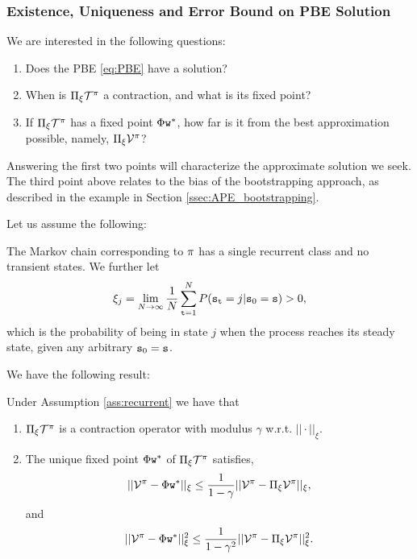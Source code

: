 
\subsubsection{Existence, Uniqueness and Error Bound on PBE Solution}
We are interested in the following questions:
\begin{enumerate}
\item Does the PBE \eqref{eq:PBE} have a solution?
\item When is $\Pi_\xi \mathcal{T}^\pi$ a contraction, and what is its fixed point?
\item If $\Pi_\xi \mathcal{T}^\pi$ has a fixed point $\Phi{\tt w}^*$, how far is it from the best approximation possible, namely, $\Pi_\xi  \mathcal{V}^\pi$?
\end{enumerate}
Answering the first two points will characterize the approximate solution we seek. The third point above relates to the bias of the bootstrapping approach, as described in the example in Section \ref{ssec:APE_bootstrapping}. 

Let us assume the following:
\begin{assumption}\label{ass:recurrent}The Markov chain corresponding to $\pi$ has a single recurrent class and no transient states. We further let
$$\xi_j = \lim_{N\rightarrow \infty} \frac{1}{N} \sum_{{\tt t}=1}^N P({\tt s}_{\tt t}=j|{\tt s}_0={\tt s})>0,$$
which is the probability of being in state $j$ when the process reaches its steady state, given any arbitrary ${\tt s}_0={\tt s}$.
\end{assumption}
We have the following result:
\begin{proposition}\label{prop:PBE_contraction} Under Assumption \ref{ass:recurrent} we have that
\begin{enumerate}
\item $\Pi_\xi \mathcal{T}^\pi$ is a contraction operator with modulus $\gamma$ w.r.t. $||\cdot||_\xi$.
\item The unique fixed point $\Phi {\tt w}^*$ of $\Pi_\xi \mathcal{T}^\pi$ satisfies,
\begin{equation}\label{eq:bias_bound_1}
    ||\mathcal{V}^\pi - \Phi {\tt w}^*||_\xi \le \frac{1}{1-\gamma}||\mathcal{V}^\pi-\Pi_\xi\mathcal{V}^\pi||_\xi,
\end{equation}
and
\begin{equation}\label{eq:bias_bound_2}
||\mathcal{V}^\pi - \Phi {\tt w}^*||_\xi^2 \le \frac{1}{1-\gamma^2}||\mathcal{V}^\pi-\Pi_\xi \mathcal{V}^\pi||_\xi^2.
\end{equation}
\end{enumerate}
\end{proposition}

